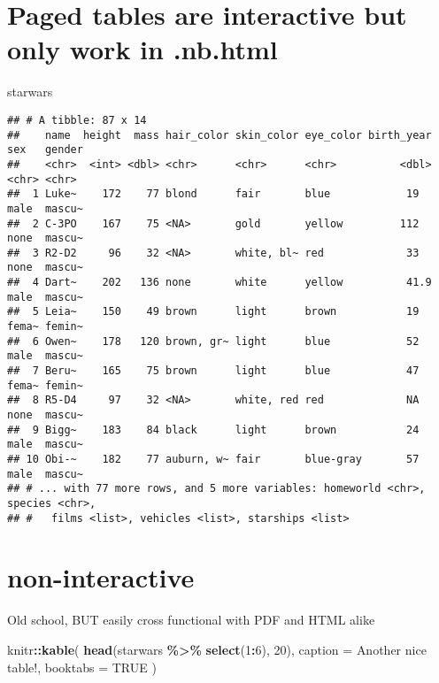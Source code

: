 \documentclass[
]{book}
\newenvironment{Shaded}{\begin{snugshade}}{\end{snugshade}}
\newcommand{\DataTypeTok}[1]{\textcolor[rgb]{0.13,0.29,0.53}{#1}}
\newcommand{\DecValTok}[1]{\textcolor[rgb]{0.00,0.00,0.81}{#1}}
\newcommand{\KeywordTok}[1]{\textcolor[rgb]{0.13,0.29,0.53}{\textbf{#1}}}
\newcommand{\NormalTok}[1]{#1}
\newcommand{\OperatorTok}[1]{\textcolor[rgb]{0.81,0.36,0.00}{\textbf{#1}}}
\newcommand{\OtherTok}[1]{\textcolor[rgb]{0.56,0.35,0.01}{#1}}
\newcommand{\StringTok}[1]{\textcolor[rgb]{0.31,0.60,0.02}{#1}}
\begin{document}
\hypertarget{paged-tables-are-interactive-but-only-work-in-.nb.html}{%
\section{Paged tables are interactive but only work in .nb.html}\label{paged-tables-are-interactive-but-only-work-in-.nb.html}}

\begin{Shaded}
\begin{Highlighting}[]
\NormalTok{starwars}
\end{Highlighting}
\end{Shaded}

\begin{verbatim}
## # A tibble: 87 x 14
##    name  height  mass hair_color skin_color eye_color birth_year sex   gender
##    <chr>  <int> <dbl> <chr>      <chr>      <chr>          <dbl> <chr> <chr> 
##  1 Luke~    172    77 blond      fair       blue            19   male  mascu~
##  2 C-3PO    167    75 <NA>       gold       yellow         112   none  mascu~
##  3 R2-D2     96    32 <NA>       white, bl~ red             33   none  mascu~
##  4 Dart~    202   136 none       white      yellow          41.9 male  mascu~
##  5 Leia~    150    49 brown      light      brown           19   fema~ femin~
##  6 Owen~    178   120 brown, gr~ light      blue            52   male  mascu~
##  7 Beru~    165    75 brown      light      blue            47   fema~ femin~
##  8 R5-D4     97    32 <NA>       white, red red             NA   none  mascu~
##  9 Bigg~    183    84 black      light      brown           24   male  mascu~
## 10 Obi-~    182    77 auburn, w~ fair       blue-gray       57   male  mascu~
## # ... with 77 more rows, and 5 more variables: homeworld <chr>, species <chr>,
## #   films <list>, vehicles <list>, starships <list>
\end{verbatim}

\hypertarget{non-interactive}{%
\section{non-interactive}\label{non-interactive}}

Old school, BUT easily cross functional with PDF and HTML alike

\begin{Shaded}
\begin{Highlighting}[]
\NormalTok{knitr}\OperatorTok{::}\KeywordTok{kable}\NormalTok{(}
  \KeywordTok{head}\NormalTok{(starwars }\OperatorTok{\%\textgreater{}\%}\StringTok{ }\KeywordTok{select}\NormalTok{(}\DecValTok{1}\OperatorTok{:}\DecValTok{6}\NormalTok{), }\DecValTok{20}\NormalTok{), }\DataTypeTok{caption =} \StringTok{\textquotesingle{}Another nice table!\textquotesingle{}}\NormalTok{,}
  \DataTypeTok{booktabs =} \OtherTok{TRUE}
\NormalTok{)}
\end{Highlighting}
\end{Shaded}
\end{document}
